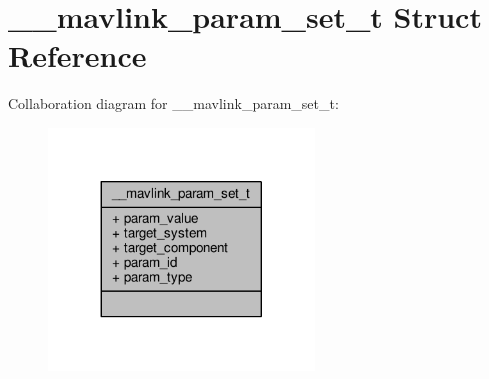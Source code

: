 \hypertarget{struct____mavlink__param__set__t}{\section{\+\_\+\+\_\+mavlink\+\_\+param\+\_\+set\+\_\+t Struct Reference}
\label{struct____mavlink__param__set__t}
}


Collaboration diagram for \+\_\+\+\_\+mavlink\+\_\+param\+\_\+set\+\_\+t\+:
\nopagebreak
\begin{figure}[H]
\begin{center}
\leavevmode
\includegraphics[width=200pt]{struct____mavlink__param__set__t__coll__graph}
\end{center}
\end{figure}
